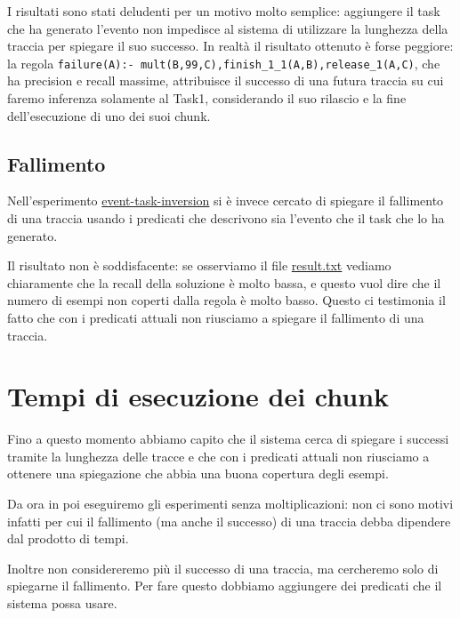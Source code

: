 I risultati sono stati deludenti per un motivo molto semplice: aggiungere il task che ha generato l'evento non impedisce al sistema di utilizzare la lunghezza della traccia per spiegare il suo successo. In realtà il risultato ottenuto è forse peggiore: la regola \texttt{failure(A):- mult(B,99,C),finish\_1\_1(A,B),release\_1(A,C)}, che ha precision e recall massime, attribuisce il successo di una futura traccia su cui faremo inferenza solamente al Task1, considerando il suo rilascio e la fine dell'esecuzione di uno dei suoi chunk.

\subsection{Fallimento}
Nell'esperimento \href{https://github.com/edoardosarri24/prediction-in-data-driven-system/7-event-task-inversion/}{event-task-inversion} si è invece cercato di spiegare il fallimento di una traccia usando i predicati che descrivono sia l'evento che il task che lo ha generato.

Il risultato non è soddisfacente: se osserviamo il file \href{https://github.com/edoardosarri24/prediction-in-data-driven-system/7-event-task-chunk-inversion/result.txt}{result.txt} vediamo chiaramente che la recall della soluzione è molto bassa, e questo vuol dire che il numero di esempi non coperti dalla regola è molto basso. Questo ci testimonia il fatto che con i predicati attuali non riusciamo a spiegare il fallimento di una traccia.

\section{Tempi di esecuzione dei chunk}
\label{sec:execution_time}
Fino a questo momento abbiamo capito che il sistema cerca di spiegare i successi tramite la lunghezza delle tracce e che con i predicati attuali non riusciamo a ottenere una spiegazione che abbia una buona copertura degli esempi.

Da ora in poi eseguiremo gli esperimenti senza moltiplicazioni: non ci sono motivi infatti per cui il fallimento (ma anche il successo) di una traccia debba dipendere dal prodotto di tempi.

Inoltre non considereremo più il successo di una traccia, ma cercheremo solo di spiegarne il fallimento. Per fare questo dobbiamo aggiungere dei predicati che il sistema possa usare.

